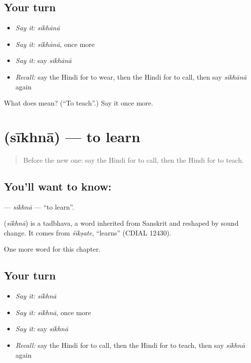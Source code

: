 \subsection*{Your turn}
\begin{itemize}
\raggedright
  \item \emph{Say it:} \emph{sikhānā}
  \item \emph{Say it:} \emph{sikhānā}, once more
  \item \emph{Say it:} say \emph{sikhānā}
  \item \emph{Recall:} say the Hindi for to wear, then the Hindi for to call, then say \emph{sikhānā} again
\end{itemize}

\begin{tcolorbox}[breakable,colback=teal!4,colframe=teal!35!black,title={Before you move on}]
What does  mean? (\textquotedblleft{}To teach\textquotedblright{}.) Say it once more.
\end{tcolorbox}
\section[\texorpdfstring{\hi{सीखना} (sīkhnā)}{सीखना (sīkhnā)}]{ (sīkhnā) — to learn}

\label{lesson:HI-C164-sikhna}



\begin{quote}
Before the new one: say the Hindi for to call, then the Hindi for to teach.
\end{quote}

\subsection*{You'll want to know: }
\textbf{} — \emph{sīkhnā} — \textquotedblleft{}to learn\textquotedblright{}.

\begin{cousinweb}
\textbf{} (\emph{sīkhnā}) is a tadbhava, a word inherited from Sanskrit and reshaped by sound change. It comes from \emph{śikṣate}, \textquotedblleft{}learns\textquotedblright{} (CDIAL 12430).
\end{cousinweb}

\begin{grammarlens}[title={What you've built}]
One more word for this chapter.
\end{grammarlens}

\subsection*{Your turn}
\begin{itemize}
\raggedright
  \item \emph{Say it:} \emph{sīkhnā}
  \item \emph{Say it:} \emph{sīkhnā}, once more
  \item \emph{Say it:} say \emph{sīkhnā}
  \item \emph{Recall:} say the Hindi for to call, then the Hindi for to teach, then say \emph{sīkhnā} again
\end{itemize}

